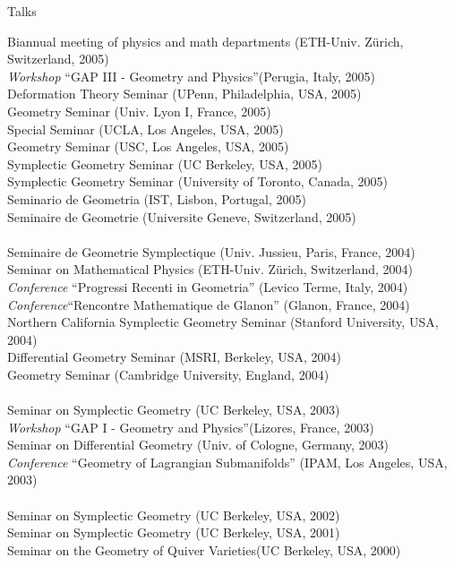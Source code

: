 \documentclass[12p]{resume}
\begin{document}
\begin{category}{Talks}
\begin{tabbing}
Biannual meeting of physics and math departments\>  (ETH-Univ.
Z\"urich, Switzerland, 2005)\\
\emph{Workshop} ``GAP III - Geometry and Physics''\>(Perugia, Italy, 2005)\\
 Deformation Theory Seminar \>(UPenn, Philadelphia, USA,
2005)\\
Geometry Seminar \>(Univ. Lyon I, France, 2005)\\
Special Seminar \>(UCLA, Los Angeles, USA, 2005)\\
Geometry Seminar \>(USC, Los Angeles, USA,  2005)\\
Symplectic Geometry Seminar \>(UC Berkeley, USA,  2005)\\
Symplectic Geometry Seminar \>(University of Toronto, Canada, 2005)\\
Seminario de Geometria \>(IST, Lisbon, Portugal, 2005)\\
Seminaire de Geometrie \>(Universite Geneve, Switzerland, 2005)\\
\> \\

Seminaire de Geometrie Symplectique \>(Univ. Jussieu, Paris, France, 2004)\\
Seminar on Mathematical Physics \>(ETH-Univ. Z\"urich, Switzerland, 2004)\\
\emph{Conference} ``Progressi Recenti in Geometria'' \>(Levico Terme, Italy, 2004)\\
\emph{Conference}``Rencontre Mathematique de Glanon'' \>(Glanon, France, 2004)\\
Northern California Symplectic Geometry Seminar \>(Stanford University, USA, 2004)\\
Differential Geometry Seminar \>(MSRI, Berkeley, USA,  2004)\\
Geometry Seminar \>(Cambridge University, England, 2004)\\
\> \\

Seminar on Symplectic Geometry \>(UC Berkeley, USA, 2003)\\
\emph{Workshop} ``GAP I - Geometry and Physics''\>(Lizores, France, 2003)\\
Seminar on Differential Geometry \>(Univ. of Cologne, Germany, 2003)\\ 
\emph{Conference} ``Geometry of Lagrangian Submanifolds'' \>(IPAM, Los
Angeles, USA, 2003)\\
\> \\ 

Seminar on Symplectic Geometry \>(UC Berkeley, USA, 2002)\\
Seminar on Symplectic Geometry \>(UC Berkeley, USA, 2001)\\
Seminar on the Geometry of Quiver Varieties\>(UC Berkeley, USA, 2000)\\
\end{tabbing}
\end{category}
\end{document}
